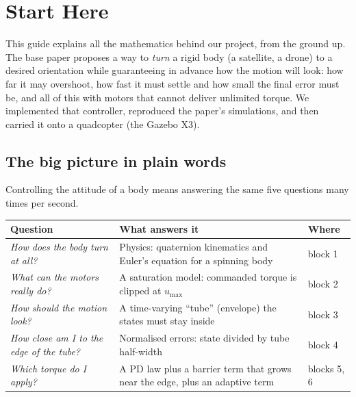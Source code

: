 \section{Start Here}
\label{sec:start}

This guide explains all the mathematics behind our project, from the ground up. The base paper proposes a way to
\emph{turn} a rigid body (a satellite, a drone) to a desired orientation while guaranteeing in advance how the motion
will look: how far it may overshoot, how fast it must settle and how small the final error must be, and all of this
with motors that cannot deliver unlimited torque. We implemented that controller, reproduced the paper's
simulations, and then carried it onto a quadcopter (the Gazebo X3).

\subsection{The big picture in plain words}

Controlling the attitude of a body means answering the same five questions many times per second.

\begin{center}\small
\begin{tabularx}{\linewidth}{@{}>{\raggedright\arraybackslash}p{4.6cm} X >{\raggedright\arraybackslash}p{2.4cm}@{}}
\toprule
\textbf{Question} & \textbf{What answers it} & \textbf{Where}\\
\midrule
\emph{How does the body turn at all?} & Physics: quaternion kinematics and Euler's equation for a spinning body & block 1\\
\emph{What can the motors really do?} & A saturation model: commanded torque is clipped at $u_{\max}$ & block 2\\
\emph{How should the motion look?} & A time-varying ``tube'' (envelope) the states must stay inside & block 3\\
\emph{How close am I to the edge of the tube?} & Normalised errors: state divided by tube half-width & block 4\\
\emph{Which torque do I apply?} & A PD law plus a barrier term that grows near the edge, plus an adaptive term & blocks 5, 6\\
\bottomrule
\end{tabularx}
\end{center}

